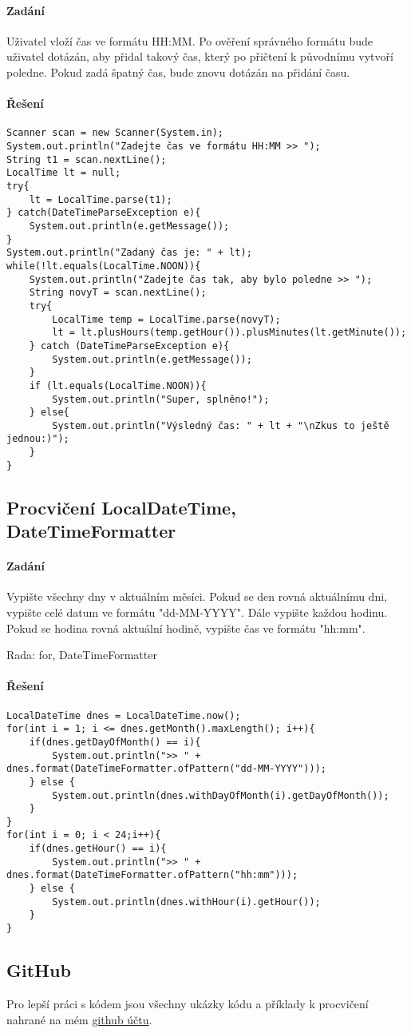 \documentclass[11pt,a4paper,titlepage]{article}
\begin{document}
\paragraph{Zadání}
Uživatel vloží čas ve formátu HH:MM. Po ověření správného formátu bude uživatel dotázán, aby přidal takový čas, který po přičtení k původnímu vytvoří poledne. Pokud zadá špatný čas, bude znovu dotázán na přidání času.
\paragraph{Řešení}
\begin{verbatim}
Scanner scan = new Scanner(System.in);
System.out.println("Zadejte čas ve formátu HH:MM >> ");
String t1 = scan.nextLine();
LocalTime lt = null;
try{
    lt = LocalTime.parse(t1);
} catch(DateTimeParseException e){
    System.out.println(e.getMessage());
}
System.out.println("Zadaný čas je: " + lt);
while(!lt.equals(LocalTime.NOON)){
    System.out.println("Zadejte čas tak, aby bylo poledne >> ");
    String novyT = scan.nextLine();
    try{
        LocalTime temp = LocalTime.parse(novyT);
        lt = lt.plusHours(temp.getHour()).plusMinutes(lt.getMinute());
    } catch (DateTimeParseException e){
        System.out.println(e.getMessage());
    }
    if (lt.equals(LocalTime.NOON)){
        System.out.println("Super, splněno!");
    } else{
        System.out.println("Výsledný čas: " + lt + "\nZkus to ještě jednou:)");
    }
}
\end{verbatim}
\subsection{Procvičení LocalDateTime, DateTimeFormatter}
\paragraph{Zadání}
Vypište všechny dny v aktuálním měsíci. Pokud se den rovná aktuálnímu dni, vypište celé datum ve formátu "dd-MM-YYYY". Dále vypište každou hodinu. Pokud se hodina rovná aktuální hodině, vypište čas ve formátu "hh:mm".

Rada: for, DateTimeFormatter
\paragraph{Řešení}
\begin{verbatim}
LocalDateTime dnes = LocalDateTime.now();
for(int i = 1; i <= dnes.getMonth().maxLength(); i++){
    if(dnes.getDayOfMonth() == i){
        System.out.println(">> " + dnes.format(DateTimeFormatter.ofPattern("dd-MM-YYYY")));
    } else {
        System.out.println(dnes.withDayOfMonth(i).getDayOfMonth());
    }
}
for(int i = 0; i < 24;i++){
    if(dnes.getHour() == i){
        System.out.println(">> " + dnes.format(DateTimeFormatter.ofPattern("hh:mm")));
    } else {
        System.out.println(dnes.withHour(i).getHour());
    }
}
\end{verbatim}
\subsection{GitHub}
Pro lepší práci s kódem jsou všechny ukázky kódu a příklady k procvičení nahrané na mém \href{https://github.com/MichalLauer/java8}{github účtu}.

\hypersetup{urlcolor=black}
\printbibliography
\end{document}
